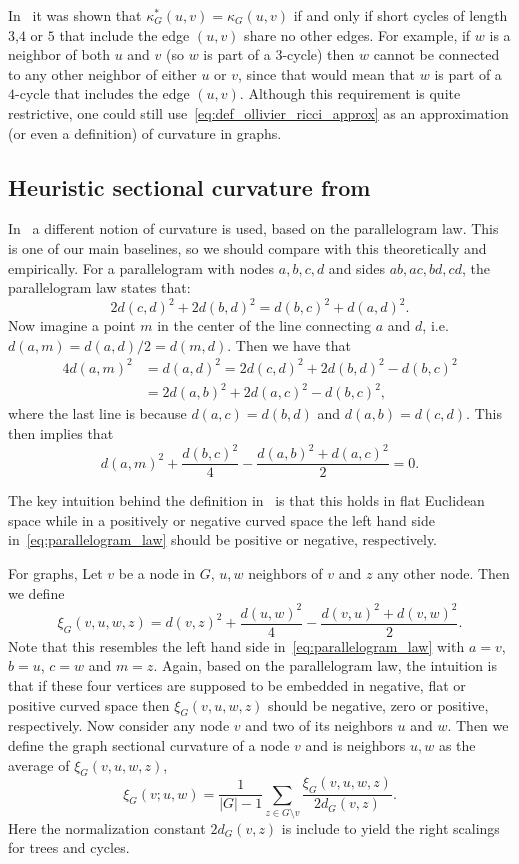 \documentclass{article}
\begin{document}
In~\cite{kelly2019self} it was shown that $\kappa_G^\ast(u,v) = \kappa_G(u,v)$ if and only if short cycles of length $3$,$4$ or $5$ that include the edge $(u,v)$ share no other edges. For example, if $w$ is a neighbor of both $u$ and $v$ (so $w$ is part of a $3$-cycle) then $w$ cannot be connected to any other neighbor of either $u$ or $v$, since that would mean that $w$ is part of a $4$-cycle that includes the edge $(u,v)$. Although this requirement is quite restrictive, one could still use~\eqref{eq:def_ollivier_ricci_approx} as an approximation (or even a definition) of curvature in graphs.

\subsection{Heuristic sectional curvature from~\cite{gu2019learning}}

In~\cite{gu2019learning} a different notion of curvature is used, based on the parallelogram law. This is one of our main baselines, so we should compare with this theoretically and empirically. For a parallelogram with nodes $a,b,c,d$ and sides $ab, ac, bd, cd$, the parallelogram law states that:
\[
	2d(c,d)^2 + 2d(b,d)^2 = d(b,c)^2 + d(a,d)^2.
\]
Now imagine a point $m$ in the center of the line connecting $a$ and $d$, i.e. $d(a,m)=d(a,d)/2=d(m,d)$. Then we have that
\begin{align*}
	4d(a,m)^2 &= d(a,d)^2 = 2d(c,d)^2 + 2d(b,d)^2 - d(b,c)^2 \\
	&= 2d(a,b)^2 + 2d(a,c)^2 - d(b,c)^2,
\end{align*}
where the last line is because $d(a,c) = d(b,d)$ and $d(a,b) = d(c,d)$. This then implies that
\begin{equation}\label{eq:parallelogram_law}
	d(a,m)^2 + \frac{d(b,c)^2}{4} - \frac{d(a,b)^2 + d(a,c)^2}{2} = 0.
\end{equation}

The key intuition behind the definition in~\cite{gu2019learning} is that this holds in flat Euclidean space while in a positively or negative curved space the left hand side in~\eqref{eq:parallelogram_law} should be positive or negative, respectively. 

For graphs, Let $v$ be a node in $G$, $u,w$ neighbors of $v$ and $z$ any other node. Then we define
\begin{equation}
	\xi_G(v,u,w,z) = d(v,z)^2 + \frac{d(u,w)^2}{4} - \frac{d(v,u)^2 + d(v,w)^2}{2}.
\end{equation}
Note that this resembles the left hand side in~\eqref{eq:parallelogram_law} with $a = v$, $b = u$, $c = w$ and $m = z$. Again, based on the parallelogram law, the intuition is that if these four vertices are supposed to be embedded in negative, flat or positive curved space then $\xi_G(v,u,w,z)$ should be negative, zero or positive, respectively. Now consider any node $v$ and two of its neighbors $u$ and $w$. Then we define the graph sectional curvature of a node $v$ and is neighbors $u,w$ as the average of $\xi_G(v,u,w,z)$,
\[
	\xi_G(v; u,w) = \frac{1}{|G|-1} \sum_{z \in G\setminus v} \frac{\xi_G(v,u,w,z)}{2d_G(v,z)}.
\] 
Here the normalization constant $2d_G(v,z)$ is include to yield the right scalings for trees and cycles.
\end{document}
